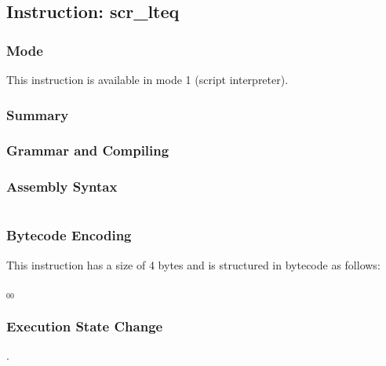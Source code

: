 \subsection{Instruction: scr\_lteq}

\subsubsection{Mode}
This instruction is available in mode 1 (script interpreter).
\subsubsection{Summary}


\subsubsection{Grammar and Compiling}


\subsubsection{Assembly Syntax}

\begin{myquote}
\begin{verbatim}

\end{verbatim}
\end{myquote}

\subsubsection{Bytecode Encoding}

This instruction has a size of 4 bytes and is structured in bytecode as follows:

$_{00}$\ 


\subsubsection{Execution State Change}

.


